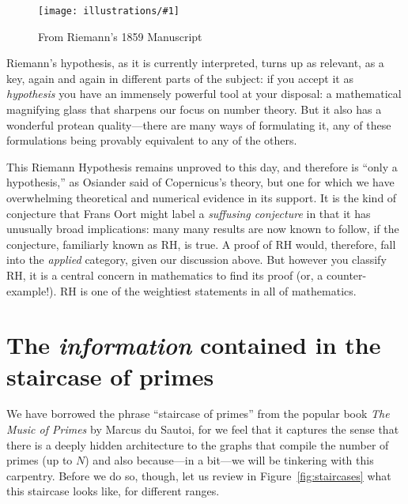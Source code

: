 \documentclass[11pt,draft]{article}
\newcommand{\ill}[3]{ 
   \begin{figure}[H]
   \begin{center}
   \texttt{[image: illustrations/\#1]}
   \caption{#3}
   \end{center}
    \end{figure}
}
\theoremstyle{plain}
\theoremstyle{definition}
\numberwithin{equation}{section}
\numberwithin{figure}{section}
\numberwithin{table}{section}
\begin{document}
\ill{riemann_zoom}{1}{From Riemann's 1859 Manuscript\label{fig:riemamn}}

Riemann's hypothesis, as it is currently interpreted, turns up as
relevant, as a key, again and again in different parts of the subject:
if you accept it as {\em hypothesis} you have an immensely powerful
tool at your disposal: a mathematical magnifying glass that sharpens
our focus on number theory. But it also has a wonderful protean
quality---there are many ways of formulating it, any of these
formulations being provably equivalent to any of the others.

This Riemann Hypothesis remains unproved to this day, and therefore is
``only a hypothesis,'' as Osiander said of Copernicus's theory, but one
for which we have overwhelming theoretical and numerical evidence in
its support.  It is the kind of conjecture that Frans Oort might label
a {\em suffusing conjecture} in that it has unusually broad
implications: many many results are now known to follow, if the
conjecture, familiarly known as RH, is true. A proof of RH would,
therefore, fall into the {\em applied} category, given our discussion
above.  But however you classify RH, it is a central concern in
mathematics to find its proof (or, a counter-example!).  RH is 
one of the weightiest statements in all of mathematics. 


\section{The {\em information} contained in the staircase of primes}
 
\bigskip

We have borrowed the phrase ``staircase of primes'' from the popular
book {\em The Music of Primes} by Marcus du Sautoi, for we feel that
it captures the sense that there is a deeply hidden architecture to
the graphs that compile the number of primes (up to $N$) and also
because---in a bit---we will be tinkering with this carpentry.  Before
we do so, though, let us review in Figure~\ref{fig:staircases}
what this staircase looks like, for
different ranges.
\end{document}
